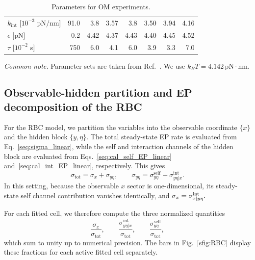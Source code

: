 \begin{table}[h]
\begin{minipage}{0.48\textwidth}
\begin{tabular}{l rrrrrrr}
            $k_{\text{int}}$ [$10^{-3}$ pN/nm] & 91.0 & 3.8 & 3.57 & 3.8 & 3.50 & 3.94 & 4.16 \\
            $\epsilon$ [pN] & 0.2 & 4.42 & 4.37 & 4.43 & 4.40 & 4.45 & 4.52 \\
            $\tau$ [$10^{-2}$ s] & 750 & 6.0 & 4.1 & 6.0 & 3.9 & 3.3 & 7.0 \\
            \bottomrule
        \end{tabular}
        \caption{Parameters for OM experiments.}
        \label{stab:RBC_parameter_OM}
    \end{minipage}
    \vspace{0.5ex}
    \begin{minipage}{0.95\textwidth}
        \footnotesize
        \textit{Common note.} Parameter sets are taken from Ref.~\cite{terlizzi2024variance}.
        We use $k_B T = 4.142\,\mathrm{pN\cdot nm}$.
    \end{minipage}
\end{table}
\vspace*{-0.6\baselineskip}

\subsection{Observable-hidden partition and EP decomposition of the RBC}
\vspace*{-0.6\baselineskip}

For the RBC model, we partition the variables into the observable coordinate $\{x\}$ and the hidden block $\{y,\eta\}$. The total steady-state EP rate is evaluated from Eq.~\eqref{seq:sigma_linear}, while the self and interaction channels of the hidden block are evaluated from Eqs.~\eqref{seq:cal_self_EP_linear} and~\eqref{seq:cal_int_EP_linear}, respectively. This gives
\[
\sigma_{\mathrm{tot}}=\sigma_{x}+\sigma_{y\eta}, 
\qquad
\sigma_{y\eta}=\sigma^{\mathrm{self}}_{y\eta}+\sigma^{\mathrm{int}}_{y\eta|x}.
\]
In this setting, because the observable \(x\) sector is one-dimensional, its steady-state self channel contribution vanishes identically, and $\sigma_x=\sigma_{x|y\eta}^{\rm int}.$ 

For each fitted cell, we therefore compute the three normalized quantities
\[
\frac{\sigma_{x}}{\sigma_{\mathrm{tot}}},
\qquad
\frac{\sigma^{\mathrm{int}}_{y\eta|x}}{\sigma_{\mathrm{tot}}},
\qquad
\frac{\sigma^{\mathrm{self}}_{y\eta}}{\sigma_{\mathrm{tot}}},
\]
which sum to unity up to numerical precision. The bars in Fig.~\ref{sfig:RBC} display these fractions for each active fitted cell separately.


